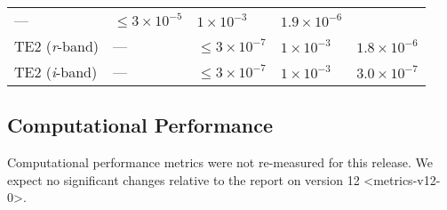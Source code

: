 \begin{longtable}[]{@{}lllll@{}}
\begin{minipage}[t]{0.05\columnwidth}
---\strut
\end{minipage} & \begin{minipage}[t]{0.24\columnwidth}\raggedright\strut
\(\leq 3\times 10^{-5}\)\strut
\end{minipage} & \begin{minipage}[t]{0.21\columnwidth}\raggedright\strut
\(1 \times 10^{-3}\)\strut
\end{minipage} & \begin{minipage}[t]{0.22\columnwidth}\raggedright\strut
\(1.9 \times 10^{-6}\)\strut
\end{minipage}\tabularnewline
\begin{minipage}[t]{0.13\columnwidth}\raggedright\strut
TE2 (\emph{r}-band)\strut
\end{minipage} & \begin{minipage}[t]{0.05\columnwidth}\raggedright\strut
---\strut
\end{minipage} & \begin{minipage}[t]{0.24\columnwidth}\raggedright\strut
\(\leq 3\times 10^{-7}\)\strut
\end{minipage} & \begin{minipage}[t]{0.21\columnwidth}\raggedright\strut
\(1 \times 10^{-3}\)\strut
\end{minipage} & \begin{minipage}[t]{0.22\columnwidth}\raggedright\strut
\(1.8 \times 10^{-6}\)\strut
\end{minipage}\tabularnewline
\begin{minipage}[t]{0.13\columnwidth}\raggedright\strut
TE2 (\emph{i}-band)\strut
\end{minipage} & \begin{minipage}[t]{0.05\columnwidth}\raggedright\strut
---\strut
\end{minipage} & \begin{minipage}[t]{0.24\columnwidth}\raggedright\strut
\(\leq 3\times 10^{-7}\)\strut
\end{minipage} & \begin{minipage}[t]{0.21\columnwidth}\raggedright\strut
\(1 \times 10^{-3}\)\strut
\end{minipage} & \begin{minipage}[t]{0.22\columnwidth}\raggedright\strut
\(3.0 \times 10^{-7}\)\strut
\end{minipage}\tabularnewline
\bottomrule
\end{longtable}

\subsection{Computational Performance}\label{computational-performance}

Computational performance metrics were not re-measured for this release.
We expect no significant changes relative to the
report on version 12 \textless{}metrics-v12-0\textgreater{}.
